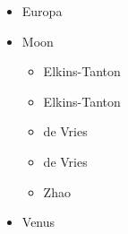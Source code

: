 \begin{itemize}

\item Europa 
\begin{scriptsize}
\cite{shha04,shha05,mish05,hash08}\cite{hash10}\cite{hash11,kast14,almc19}
\end{scriptsize}

\item Moon 
\begin{scriptsize}
\begin{itemize}
\item[\twothousandtwo] Elkins-Tanton \etal \cite{elvh02}
\item[\twothousandfour] Elkins-Tanton \etal \cite{elhg04}
\item[\twothousandten] de Vries \etal \cite{devv10}
\item[\twothousandthirteen] de Vries \etal \cite{dejv13} 
\item[\twothousandnineteen] Zhao \etal \cite{zhdv19}
\end{itemize}
\end{scriptsize}
 
\item Venus 


\end{itemize}
